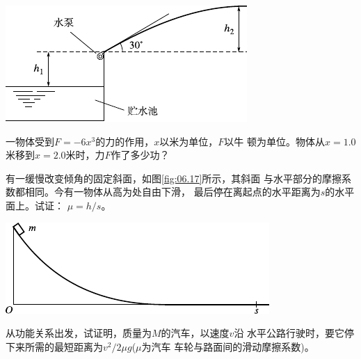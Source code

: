 \begin{exercises}
\begin{figurex}
  \centering
  \includegraphics{figure/fig06.16}
  \caption{}
  \label{fig:06.16}
\end{figurex}

\exercise 一物体受到$ F = - 6 x ^ { 3 } $的力的作用，$ x $以米为单位，$ F $以牛
顿为单位。物体从$ x = 1.0 $米移到$ x = 2.0 $米时，力$ F $作了多少功？

\clearpage
\exercise 有一缓慢改变倾角的固定斜面，如图\ref{fig:06.17}\;所示，其斜面
与水平部分的摩擦系数都相同。今有一物体从高为处自由下滑，
最后停在离起点的水平距离为$ s $的水平面上。试证： $ \mu = h / s $。
\begin{figurex}
  \centering
  \includegraphics{figure/fig06.17}
  \caption{}
  \label{fig:06.17}
\end{figurex}

\exercise 从功能关系出发，试证明，质量为$ M $的汽车，以速度$ v $沿
水平公路行驶时，要它停下来所需的最短距离为$ v ^ { 2 } / 2 \mu g $($ \mu $为汽车
车轮与路面间的滑动摩擦系数)。


\end{exercises}
